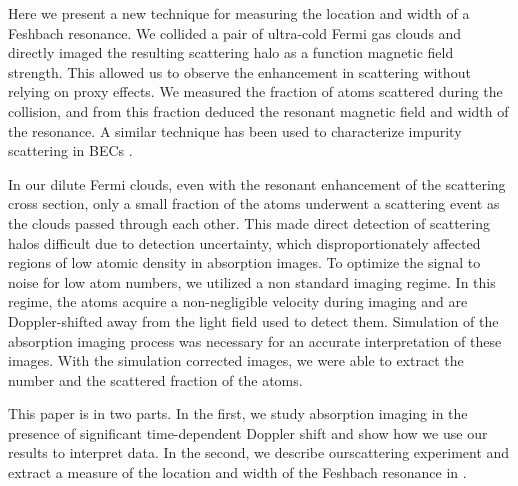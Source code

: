 \documentclass[12pt]{iopart}
\begin{document}
\par Here we present a new technique for measuring the location and width of a Feshbach resonance. We collided a pair of ultra-cold Fermi gas clouds and directly imaged the resulting \swave scattering halo as a function magnetic field strength. This allowed us to observe the enhancement in scattering without relying on proxy effects. We measured the fraction of atoms scattered during the collision, and from this fraction deduced the resonant magnetic field  and width of the resonance. A similar technique has been used to characterize impurity scattering in BECs \cite{Chikkatur00}.
\par In our dilute Fermi clouds, even with the resonant enhancement of the scattering cross section, only a small fraction of the atoms underwent a scattering event as the clouds passed through each other. This made direct detection of \swave scattering halos difficult due to detection uncertainty, which disproportionately affected regions of low atomic density in absorption images. To optimize the signal to noise for low atom numbers, we utilized a non standard imaging regime. In this regime, the atoms acquire a non-negligible velocity during imaging and are Doppler-shifted away from the light field used to detect them.  Simulation of the absorption imaging process was necessary for an accurate interpretation of these images. With the simulation corrected images, we were able to extract the number and the scattered fraction of the atoms.
\par This paper is in two parts. In the first, we study absorption imaging in the presence of significant time-dependent Doppler shift and show how we use our results to interpret data. In the second, we describe our\swave scattering experiment and extract a measure of the location and width of the Feshbach resonance in \K{}. 
\end{document}
